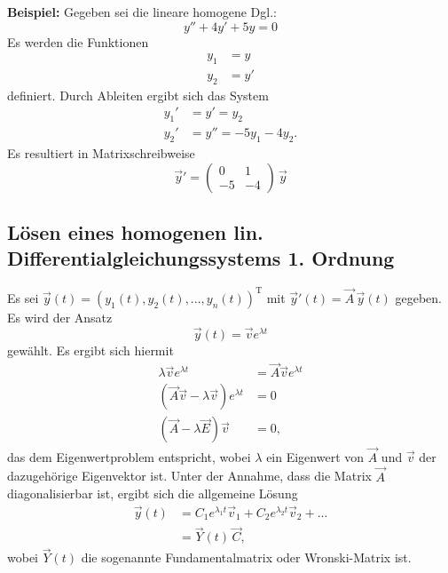 \noindent
\textbf{Beispiel:}
Gegeben sei die lineare homogene Dgl.:
\[ y'' + 4y' + 5y = 0 \]
\noindent
Es werden die Funktionen
\begin{align*}
  y_1 &= y \\
  y_2 &= y'
\end{align*}
definiert.
\noindent
Durch Ableiten ergibt sich das System
\begin{align*}
  y_1' &= y' = y_2 \\
  y_2' &= y'' =  - 5y_1-4y_2 .
\end{align*}
\noindent
Es resultiert in Matrixschreibweise
$$
\vec y' = \begin{pmatrix}  0 & 1 \\ -5 & -4 \end{pmatrix} \, \vec y
$$


\subsection*{L\"osen eines homogenen lin. Differentialgleichungssystems 1. Ordnung}
Es sei $\vec y(t) = \left( y_1(t), y_2(t), ..., y_n(t)\right)^{\text{T}}$ mit $\vec y'(t) = \vec A\, \vec y(t)$ gegeben.
Es wird der Ansatz
$$
\vec y(t) = \vec v e^{\lambda t} 
$$
gew\"ahlt. Es ergibt sich hiermit
\begin{align*}
\lambda \vec v e^{\lambda t}   &= \vec A \vec v e^{\lambda t}  \\
(\vec A \vec v - \lambda \vec v)e^{\lambda t}  &= 0 \\
(\vec A -\lambda \vec E)\vec v &= 0,
\end{align*}
das dem Eigenwertproblem entspricht, wobei $\lambda$ ein Eigenwert von $\vec A$ und $\vec v$ der dazugeh\"orige Eigenvektor ist. Unter der Annahme, dass die Matrix $\vec A$ diagonalisierbar ist, ergibt sich die allgemeine L\"osung
\begin{align*}
\vec y(t) &= C_1 e^{\lambda_1 t } \vec v_1 +C_2 e^{\lambda_2 t} \vec v_2 + ... \\
          &= \vec Y(t) \, \vec C,
\end{align*}
wobei $\vec Y(t)$ die sogenannte Fundamentalmatrix oder Wronski-Matrix ist.\\

